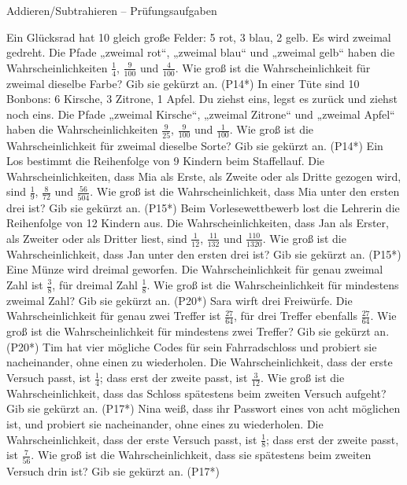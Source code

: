 \begin{aufgabe}{Addieren/Subtrahieren – Prüfungsaufgaben}
\begin{teile}
\steil Ein Glücksrad hat 10 gleich große Felder: 5 rot, 3 blau, 2 gelb. Es wird zweimal gedreht. Die Pfade „zweimal rot“, „zweimal blau“ und „zweimal gelb“ haben die Wahrscheinlichkeiten $\frac{1}{4}$, $\frac{9}{100}$ und $\frac{4}{100}$. Wie groß ist die Wahrscheinlichkeit für zweimal dieselbe Farbe? Gib sie gekürzt an. \hfill (P14*)
\steil In einer Tüte sind 10 Bonbons: 6 Kirsche, 3 Zitrone, 1 Apfel. Du ziehst eins, legst es zurück und ziehst noch eins. Die Pfade „zweimal Kirsche“, „zweimal Zitrone“ und „zweimal Apfel“ haben die Wahrscheinlichkeiten $\frac{9}{25}$, $\frac{9}{100}$ und $\frac{1}{100}$. Wie groß ist die Wahrscheinlichkeit für zweimal dieselbe Sorte? Gib sie gekürzt an. \hfill (P14*)
\steil Ein Los bestimmt die Reihenfolge von 9 Kindern beim Staffellauf. Die Wahrscheinlichkeiten, dass Mia als Erste, als Zweite oder als Dritte gezogen wird, sind $\frac{1}{9}$, $\frac{8}{72}$ und $\frac{56}{504}$. Wie groß ist die Wahrscheinlichkeit, dass Mia unter den ersten drei ist? Gib sie gekürzt an. \hfill (P15*)
\steil Beim Vorlesewettbewerb lost die Lehrerin die Reihenfolge von 12 Kindern aus. Die Wahrscheinlichkeiten, dass Jan als Erster, als Zweiter oder als Dritter liest, sind $\frac{1}{12}$, $\frac{11}{132}$ und $\frac{110}{1320}$. Wie groß ist die Wahrscheinlichkeit, dass Jan unter den ersten drei ist? Gib sie gekürzt an. \hfill (P15*)
\steil Eine Münze wird dreimal geworfen. Die Wahrscheinlichkeit für genau zweimal Zahl ist $\frac{3}{8}$, für dreimal Zahl $\frac{1}{8}$. Wie groß ist die Wahrscheinlichkeit für mindestens zweimal Zahl? Gib sie gekürzt an. \hfill (P20*)
\steil Sara wirft drei Freiwürfe. Die Wahrscheinlichkeit für genau zwei Treffer ist $\frac{27}{64}$, für drei Treffer ebenfalls $\frac{27}{64}$. Wie groß ist die Wahrscheinlichkeit für mindestens zwei Treffer? Gib sie gekürzt an. \hfill (P20*)
\steil Tim hat vier mögliche Codes für sein Fahrradschloss und probiert sie nacheinander, ohne einen zu wiederholen. Die Wahrscheinlichkeit, dass der erste Versuch passt, ist $\frac{1}{4}$; dass erst der zweite passt, ist $\frac{3}{12}$. Wie groß ist die Wahrscheinlichkeit, dass das Schloss spätestens beim zweiten Versuch aufgeht? Gib sie gekürzt an. \hfill (P17*)
\steil Nina weiß, dass ihr Passwort eines von acht möglichen ist, und probiert sie nacheinander, ohne eines zu wiederholen. Die Wahrscheinlichkeit, dass der erste Versuch passt, ist $\frac{1}{8}$; dass erst der zweite passt, ist $\frac{7}{56}$. Wie groß ist die Wahrscheinlichkeit, dass sie spätestens beim zweiten Versuch drin ist? Gib sie gekürzt an. \hfill (P17*)

\end{teile}
\end{aufgabe}
